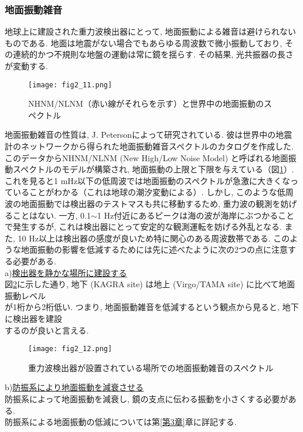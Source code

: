 \subsubsection{地面振動雑音}
\vskip3mm
地球上に建設された重力波検出器にとって, 地面振動による雑音は避けられないものである. 地面は地震がない場合でもあらゆる周波数で微小振動しており, その連続的かつ不規則な地盤の運動は常に鏡を揺らす. その結果, 光共振器の長さが変動する. 
\begin{figure}[H]
\begin{center}
\texttt{[image: fig2\_11.png]}
\caption[NHNM/NLNMと世界中の地面振動のスペクトル]{NHNM/NLNM（赤い線がそれらを示す）と世界中の地面振動のスペクトル\cite{33}}
\label{fig2.11}
\end{center}
\end{figure}
地面振動雑音の性質は, J. Petersonによって研究されている\cite{33}. 彼は世界中の地震計のネットワークから得られた地面振動雑音スペクトルのカタログを作成した. このデータからNHNM/NLNM (New High/Low Noise Model) と呼ばれる地面振動スペクトルのモデルが構築され, 地面振動の上限と下限を与えている（図\ref{fig2.11}）. 
これを見ると1 mHz以下の低周波では地面振動のスペクトルが急激に大きくなっていることがわかる（これは地球の潮汐変動による）. しかし, このような低周波の地面振動では検出器のテストマスも共に移動するため, 重力波の観測を妨げることはない. 一方, 0.1$\sim$1 Hz付近にあるピークは海の波が海岸にぶつかることで発生するが, これは検出器にとって安定的な観測運転を妨げる外乱となる. また, 10 Hz以上は検出器の感度が良いため特に関心のある周波数帯である. このような地面振動の影響を低減するためには先に述べたように次の2つの点に注意する必要がある. \\
\quad a)\underline{検出器を静かな場所に建設する}\\
\qquad 図\ref{fig2.12}に示した通り, 地下 (KAGRA site) は地上 (Virgo/TAMA site) に比べて地面振動レベル\\\qquad が1桁から2桁低い. つまり, 地面振動雑音を低減するという観点から見ると, 地下に検出器を建設\\\qquad するのが良いと言える. 
\begin{figure}[H]
\begin{center}
\texttt{[image: fig2\_12.png]}
\caption[地面振動雑音のスペクトル]{重力波検出器が設置されている場所での地面振動雑音のスペクトル\cite{34}}
\label{fig2.12}
\end{center}
\end{figure}
\noindent
\quad b)\underline{防振系により地面振動を減衰させる}\\
\qquad 防振系によって地面振動を減衰し, 鏡の支点に伝わる振動を小さくする必要がある. \\\qquad 防振系による地面振動の低減については第\ref{第3章}章に詳記する. 

